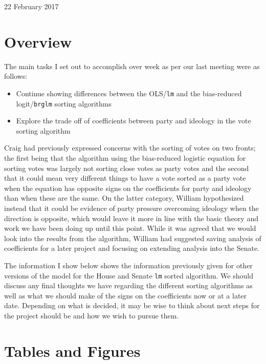 \documentclass[12pt]{article}
\begin{document}
\begin{center}
\Large 22 February 2017
\end{center}

\section{Overview}

The main tasks I set out to accomplish over week as per our last meeting were as follows:

\begin{itemize}
	\item Continue showing differences between the OLS/\verb|lm| and the bias-reduced logit/\verb|brglm| sorting algorithms

	\item Explore the trade off of coefficients between party and ideology in the vote sorting algorithm
\end{itemize}

\noindent
Craig had previously expressed concerns with the sorting of votes on two fronts; the first being that the algorithm using the bias-reduced logistic equation for sorting votes was largely not sorting close votes as party votes and the second that it could mean very different things to have a vote sorted as a party vote when the equation has opposite signs on the coefficients for party and ideology than when these are the same. On the latter category, William hypothesized instead that it could be evidence of party pressure overcoming ideology when the direction is opposite, which would leave it more in line with the basic theory and work we have been doing up until this point. While it was agreed that we would look into the results from the algorithm, William had suggested saving analysis of coefficients for a later project and focusing on extending analysis into the Senate.

The information I show below shows the information previously given for other versions of the model for the House and Senate \verb|lm| sorted algorithm. We should discuss any final thoughts we have regarding the different sorting algorithms as well as what we should make of the signs on the coefficients now or at a later date. Depending on what is decided, it may be wise to think about next steps for the project should be and how we wish to pursue them.

\section{Tables and Figures}
\end{document}
